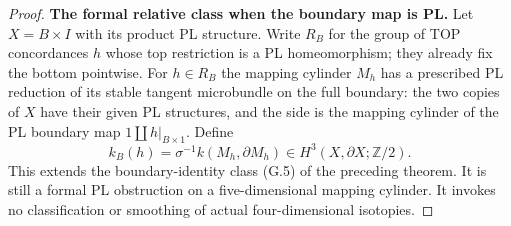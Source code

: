 \begin{proof}
\textbf{The formal relative class when the boundary map is PL.}
Let $X=B\times I$ with its product PL structure. Write $R_B$ for the
group of TOP concordances $h$ whose top restriction is a PL
homeomorphism; they already fix the bottom pointwise. For $h\in R_B$
the mapping cylinder $M_h$ has a prescribed PL reduction of its stable
tangent microbundle on the full boundary: the two copies of $X$ have
their given PL structures, and the side is the mapping cylinder of the
PL boundary map $1\amalg h|_{B\times1}$. Define
\[
 k_B(h)=\sigma^{-1}k(M_h,\partial M_h)
             \in H^3(X,\partial X;\mathbb Z/2).
                                                        \tag{C3.3}
\]
This extends the boundary-identity class (G.5) of the preceding
theorem. It is still a formal PL obstruction on a five-dimensional
mapping cylinder. It invokes no classification or smoothing of actual
four-dimensional isotopies.


\end{proof}
